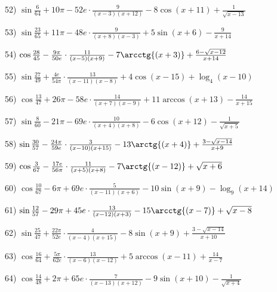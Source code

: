 \documentclass[11pt,ukrainian]{article}
\begin{document}
52) \space 
{ ${\sin\frac{6}{64}} + 10{\pi} - 52 e\cdot {\frac{9}{(x - 3)(x + 12)}} - {8\cos{(x + 11)}} + {\frac{1}{\sqrt{x - 13}}}$}
\smallskip\par
53) \space 
{ ${\sin\frac{23}{65}} + 11{\pi} - 48 e\cdot {\frac{9}{(x + 8)(x - 3)}} + {5\sin{(x + 6)}} - { \frac{9}{x + 14}}$}
\smallskip\par
54) \space 
{ ${\cos\frac{28}{45}} - \frac{9{\pi}}{50 e}\cdot {\frac{11}{(x - 5)(x + 9)}} - {7\arcctg{(x + 3)}} + {\frac{6 - \sqrt{x - 12}}{x + 14}}$}
\smallskip\par
55) \space 
{ ${\sin\frac{27}{49}} + \frac{4 e}{54{\pi}}\cdot {\frac{13}{(x - 11)(x - 8)}} + {4\cos{(x - 15)}} + {\log_{4}(x - 10)}$}
\smallskip\par
56) \space 
{ ${\cos\frac{13}{47}} + 26{\pi} - 58 e\cdot {\frac{14}{(x + 7)(x - 9)}} + {11\arccos{(x + 13)}} - { \frac{14}{x + 15}}$}
\smallskip\par
57) \space 
{ ${\sin\frac{8}{60}} - 21{\pi} - 69 e\cdot {\frac{10}{(x + 4)(x + 8)}} - {6\cos{(x + 12)}} - {\frac{1}{\sqrt{x + 5}}}$}
\smallskip\par
58) \space 
{ ${\sin\frac{30}{57}} - \frac{24{\pi}}{59 e}\cdot {\frac{3}{(x - 10)(x + 15)}} - {13\arctg{(x + 4)}} + {\frac{3 - \sqrt{x - 14}}{x + 9}}$}
\smallskip\par
59) \space 
{ ${\cos\frac{3}{67}} - \frac{17 e}{56{\pi}}\cdot {\frac{11}{(x + 5)(x + 8)}} - {7\arctg{(x - 12)}} + {\sqrt{x + 6}}$}
\smallskip\par
60) \space 
{ ${\cos\frac{10}{67}} - 6{\pi} + 69 e\cdot {\frac{5}{(x - 11)(x + 6)}} - {10\sin{(x + 9)}} - {\log_{9}(x + 14)}$}
\smallskip\par
61) \space 
{ ${\sin\frac{12}{57}} - 29{\pi} + 45 e\cdot {\frac{13}{(x - 12)(x + 3)}} - {15\arcctg{(x - 7)}} + {\sqrt{x - 8}}$}
\smallskip\par
62) \space 
{ ${\sin\frac{25}{47}} + \frac{22{\pi}}{52 e}\cdot {\frac{4}{(x - 4)(x + 15)}} - {8\sin{(x + 9)}} + {\frac{3 - \sqrt{x - 14}}{x + 10}}$}
\smallskip\par
63) \space 
{ ${\cos\frac{16}{64}} + \frac{5{\pi}}{62 e}\cdot {\frac{13}{(x - 6)(x - 12)}} + {5\arccos{(x - 11)}} + { \frac{14}{x - 7}}$}
\smallskip\par
64) \space 
{ ${\cos\frac{14}{48}} + 2{\pi} + 65 e\cdot {\frac{7}{(x - 13)(x + 12)}} - {9\sin{(x + 10)}} - {\frac{1}{\sqrt{x + 4}}}$}
\smallskip\par
\end{document}
